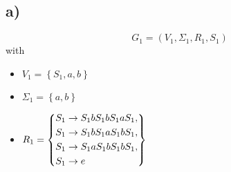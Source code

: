 \subsection*{a)}


\begin{equation*}
  G_1 = \left( V_1, \Sigma_1, R_1, S_1 \right)
\end{equation*}
with
\begin{multicols}{3}
  \begin{itemize}
    \vspace*{\fill}
    \item[] $V_1 = \left\{ S_1, a, b \right\}$
    \vspace*{\fill}

    \columnbreak
    
    \vspace*{\fill}
    \item[] $\Sigma_1 = \left\{ a, b \right\}$
    \vspace*{\fill}
    
    \columnbreak
    
    \vspace*{\fill}
    \item[] $R_1 = \left\{
    \begin{aligned}
      &S_1 \rightarrow S_1bS_1bS_1aS_1,\\
      &S_1 \rightarrow S_1bS_1aS_1bS_1,\\
      &S_1 \rightarrow S_1aS_1bS_1bS_1,\\
      &S_1 \rightarrow e
    \end{aligned} \right\}$
    \vspace*{\fill}
  \end{itemize}
\end{multicols}
